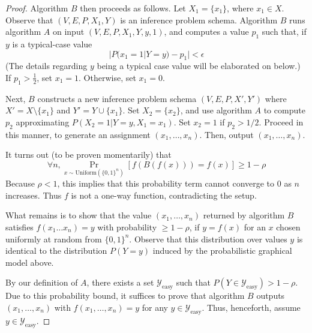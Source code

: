 \documentclass{article}
\theoremstyle{definition}
\theoremstyle{remark}
\begin{document}
\begin{proof}
Algorithm $B$ then proceeds as follows.
Let $X_1 = \{x_1\}$, where $x_1 \in X$.
Observe that $(V, E, P, X_1, Y)$ is an inference problem schema.
Algorithm $B$ runs algorithm $A$ on input $(V, E, P, X_1, Y, y, 1)$, and computes a value $p_1$ such that, if $y$ is a typical-case value 
$$
|P(x_1 = 1 | Y = y) - p_1| < \epsilon
$$
(The details regarding $y$ being a typical case value will be elaborated on below.)
If $p_1 > \frac{1}{2}$, set $x_1 = 1$.
Otherwise, set $x_1 = 0$.

Next, $B$ constructs a new inference problem schema $(V, E, P, X', Y')$
where $X' = X \setminus \{x_1\}$ and $Y' = Y \cup \{x_1\}$.
Set $X_2 = \{x_2\}$, and use algorithm $A$ to compute $p_2$
approximating $P(X_2 = 1 | Y = y, X_1 = x_1)$.
Set $x_2 = 1$ if $p_2 > 1/2$.
Proceed in this manner, to generate an assignment $(x_1, \dots, x_n)$.
Then, output $(x_1, \dots, x_n)$.

It turns out (to be proven momentarily) that
$$
\forall n,
\Pr_{x \sim \text{Uniform}(\{0, 1\}^n)}[f(B(f(x))) = f(x)] \geq 1 - \rho
$$
Because $\rho < 1$, this implies that this probability term cannot converge to 0 as $n$ increases.
Thus $f$ is not a one-way function, contradicting the setup.

What remains is to show that the value $(x_1, \dots, x_n)$ returned by algorithm $B$ satisfies $f(x_1 \dots x_n) = y$ with probability $\geq 1 - \rho$,
if $y = f(x)$ for an $x$ chosen uniformly at random from $\{0, 1\}^n$.
Observe that this distribution over values $y$ is identical to the distribution $P(Y = y)$ induced by the probabilistic graphical model above.

By our definition of $A$, there exists a set $\mathcal{Y}_\text{easy}$
such that $P(Y \in \mathcal{Y}_\text{easy}) > 1 - \rho$.
Due to this probability bound, it suffices to prove that algorithm $B$ outputs $(x_1, \dots, x_n)$ with $f(x_1, \dots, x_n) = y$ for any $y \in \mathcal{Y}_\text{easy}$.
Thus, henceforth, assume $y \in \mathcal{Y}_\text{easy}$.



\end{proof}
\end{document}
